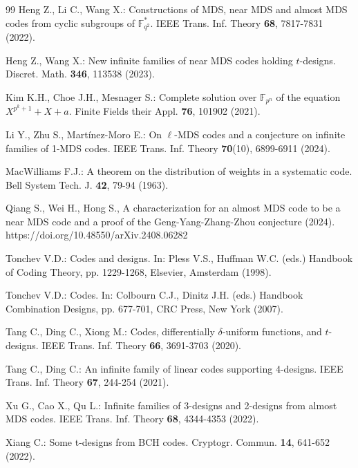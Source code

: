 \documentclass[sn-mathphys-num]{sn-jnl}%
\theoremstyle{thmstyleone}%
\theoremstyle{thmstyletwo}%
\theoremstyle{thmstylethree}%
\begin{document}
\begin{thebibliography}{99}
	 Heng Z., Li C., Wang X.: Constructions of MDS, near MDS and almost MDS codes from cyclic subgroups of $\mathbb{F}^\ast_{q^2}$. IEEE Trans. Inf. Theory \textbf{68}, 7817-7831 (2022).
	
	 Heng Z., Wang X.:  New infinite families of near MDS codes holding $t$-designs. Discret. Math. \textbf{346}, 113538 (2023).
	
	 Kim K.H., Choe J.H., Mesnager S.: Complete solution over $\mathbb{F}_{p^n}$ of the equation $X^{p^k+1}+X+a$. Finite Fields their Appl. \textbf{76}, 101902 (2021).
	
	 Li Y., Zhu S., Martínez-Moro E.: On $\ell$-MDS codes and a conjecture on infinite families of 1-MDS codes. IEEE Trans. Inf. Theory \textbf{70}(10), 6899-6911 (2024).
	
	 MacWilliams F.J.: A theorem on the distribution of weights in a systematic code. Bell System Tech. J. \textbf{42}, 79-94 (1963).
	
	 Qiang S., Wei H., Hong S., A characterization for an almost MDS code to be a near MDS code and a proof of the Geng-Yang-Zhang-Zhou conjecture (2024). 
	https://doi.org/10.48550/arXiv.2408.06282
	
	 Tonchev V.D.: Codes and designs. In: Pless V.S., Huffman W.C. (eds.) Handbook of Coding Theory, pp. 1229-1268, Elsevier, Amsterdam (1998).
	
	 Tonchev V.D.: Codes. In: Colbourn C.J., Dinitz J.H. (eds.) Handbook Combination Designs, pp. 677-701, CRC Press, New York (2007).
	
	 Tang C., Ding C., Xiong M.: Codes, differentially $\delta$-uniform functions, and $t$-designs. IEEE Trans. Inf. Theory \textbf{66}, 3691-3703 (2020).
	
	 Tang C., Ding C.: An infinite family of linear codes supporting 4-designs. IEEE Trans. Inf. Theory \textbf{67}, 244-254 (2021).
	
	 Xu G., Cao X., Qu L.: Infinite families of $3$-designs and 2-designs from almost MDS codes. IEEE Trans. Inf. Theory \textbf{68}, 4344-4353 (2022).
	
	 Xiang C.: Some t-designs from BCH codes. Cryptogr. Commun. \textbf{14}, 641-652 (2022).
	

\end{thebibliography}
\end{document}
